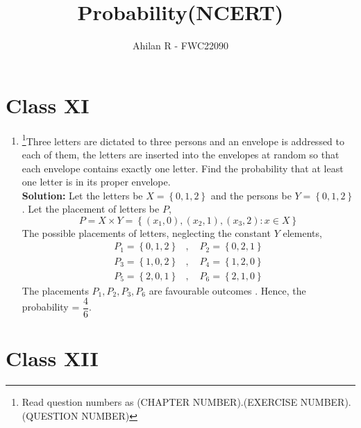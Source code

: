 \documentclass[journal,12pt,twocolumn]{IEEEtran}
\providecommand{\cbrak}[1]{\ensuremath{\left\{#1\right\}}}
\newcommand{\solution}{\noindent \textbf{Solution: }}
\begin{document}
\title{Probability(NCERT)}
\author{\Large Ahilan R - FWC22090}

\maketitle

\section*{Class XI}

\begin{enumerate}[label=16.\arabic{enumi}.\arabic{enumii}]%
\setcounter{enumi}{3}
\setcounter{enumii}{6}
\item \footnote{Read question numbers as (CHAPTER NUMBER).(EXERCISE NUMBER).(QUESTION NUMBER)}Three letters are dictated to three persons and an envelope is addressed to each of them, the letters are inserted into the envelopes at random so that each envelope contains exactly one letter. Find the probability that at least one letter is in its proper envelope.\\
	\solution
		Let the letters be $X = \cbrak{0,1,2}$ and the persons be $Y = \cbrak{0,1,2}$. Let the placement of letters be $P$,
		\[P = X \times Y = \cbrak{(x_1,0),(x_2,1),(x_3,2): x \in X} \] 
  The possible placements of letters, neglecting the constant $Y$ elements, %
  \begin{align*}
	  P_1 = \cbrak{0,1,2} &, \quad P_2 = \cbrak{0,2,1} \\
	  P_3 = \cbrak{1,0,2} &, \quad P_4 = \cbrak{1,2,0} \\
	  P_5 = \cbrak{2,0,1} &, \quad P_6 = \cbrak{2,1,0} 
  \end{align*}
		The placements $P_1, P_2, P_3, P_6$ are favourable outcomes . %
		Hence, the probability =  $\dfrac{4}{6}$.\\ %
		
\noindent{}
\end{enumerate}

\section*{Class XII}
\end{document}
